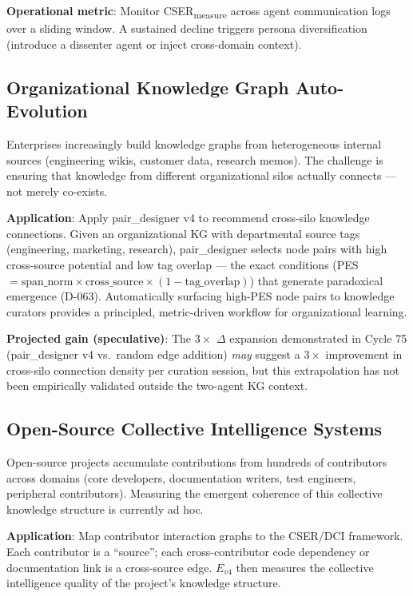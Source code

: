 \documentclass[12pt]{article}
\begin{document}
\textbf{Operational metric}: Monitor CSER\textsubscript{measure} across agent communication logs over a sliding window. A sustained decline triggers persona diversification (introduce a dissenter agent or inject cross-domain context).

\subsection{Organizational Knowledge Graph Auto-Evolution}

Enterprises increasingly build knowledge graphs from heterogeneous internal sources (engineering wikis, customer data, research memos). The challenge is ensuring that knowledge from different organizational silos actually connects --- not merely co-exists.

\textbf{Application}: Apply pair\_designer v4 to recommend cross-silo knowledge connections. Given an organizational KG with departmental source tags (engineering, marketing, research), pair\_designer selects node pairs with high cross-source potential and low tag overlap --- the exact conditions (PES $= \text{span\_norm} \times \text{cross\_source} \times (1-\text{tag\_overlap})$) that generate paradoxical emergence (D-063). Automatically surfacing high-PES node pairs to knowledge curators provides a principled, metric-driven workflow for organizational learning.

\textbf{Projected gain (speculative)}: The $3\times$ $\Delta$ expansion demonstrated in Cycle 75 (pair\_designer v4 vs.\ random edge addition) \emph{may} suggest a $3\times$ improvement in cross-silo connection density per curation session, but this extrapolation has not been empirically validated outside the two-agent KG context.

\subsection{Open-Source Collective Intelligence Systems}

Open-source projects accumulate contributions from hundreds of contributors across domains (core developers, documentation writers, test engineers, peripheral contributors). Measuring the emergent coherence of this collective knowledge structure is currently ad hoc.

\textbf{Application}: Map contributor interaction graphs to the CSER/DCI framework. Each contributor is a ``source''; each cross-contributor code dependency or documentation link is a cross-source edge. $E_{v4}$ then measures the collective intelligence quality of the project's knowledge structure.
\end{document}
